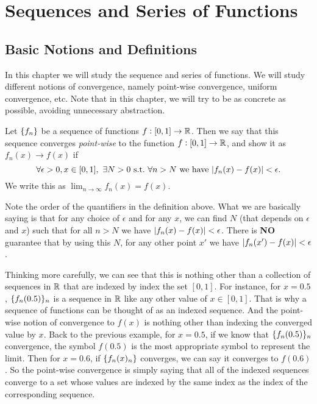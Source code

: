 \chapter{Sequences and Series of Functions}

\section{Basic Notions and Definitions}

In this chapter we will study the sequence and series of functions. We will study different notions of convergence, namely point-wise convergence, uniform convergence, etc. Note that in this chapter, we will try to be as concrete as possible, avoiding unnecessary abstraction.

\begin{definition}
	Let $\{f_n\}$ be a sequence of functions $f: [0,1] \to \mathbb{R}$. Then we say that this sequence converges \emph{point-wise} to the function $f:[0,1]\to\mathbb{R}$, and show it as $f_n(x)\to f(x)$ if
	\[ \forall \epsilon>0, x\in [0,1],\ \exists N>0 \st \forall n>N \wh \abs{f_n(x) - f(x)} < \epsilon.  \]
	We write this as $\lim_{n\to\infty}f_n(x) = f(x)$.
\end{definition}
\begin{remark}
	Note the order of the quantifiers in the definition above. What we are basically saying is that for any choice of $\epsilon$ and for any $x$, we can find $N$ (that depends on $\epsilon$ and $x$) such that for all $n>N$ we have $|f_n(x)-f(x)|<\epsilon$. There is \textbf{NO} guarantee that by using this $N$, for any other point $x'$ we have $|f_n(x') - f(x)| < \epsilon$.
\end{remark}

Thinking more carefully, we can see that this is nothing other than a collection of sequences in $\mathbb{R}$ that are indexed by index the set $[0,1]$. For instance, for $x=0.5$, $\{f_n(0.5)\}_n$ is a sequence in $\mathbb{R}$ like any other value of $x\in [0,1]$. That is why a sequence of functions can be thought of as an indexed sequence. And the point-wise notion of convergence to $f(x)$ is nothing other than indexing the converged value by $x$. Back to the previous example, for $x=0.5$, if we know that $\{f_n(0.5)\}_n$ convergence, the symbol $f(0.5)$ is the most appropriate symbol to represent the limit. Then for $x=0.6$, if $\{f_n(x)_n\}$ converges, we can say it converges to $f(0.6)$. So the point-wise convergence is simply saying that all of the indexed sequences converge to a set whose values are indexed by the same index as the index of the corresponding sequence. 

